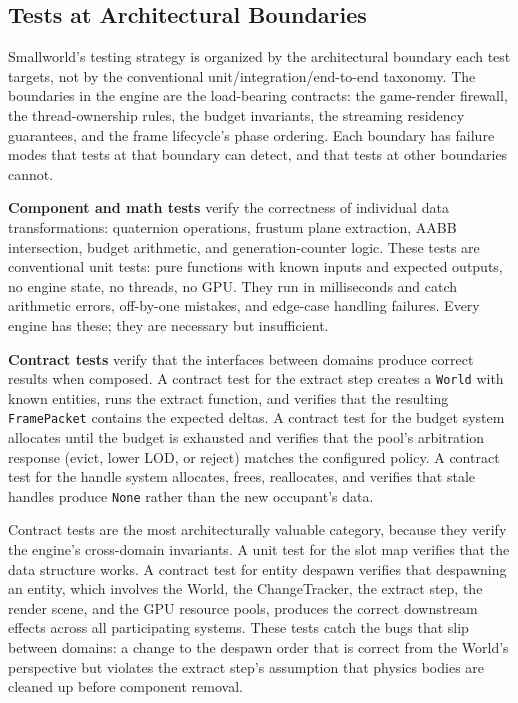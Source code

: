 \documentclass[
  11pt,
  letterpaper,
  DIV=11,
  numbers=noendperiod,
  twoside,
  open=right]{scrreprt}
\begin{document}
\subsection{Tests at Architectural Boundaries}\label{sec-tests}

Smallworld's testing strategy is organized by the architectural boundary
each test targets, not by the conventional unit/integration/end-to-end
taxonomy. The boundaries in the engine are the load-bearing contracts:
the game-render firewall, the thread-ownership rules, the budget
invariants, the streaming residency guarantees, and the frame
lifecycle's phase ordering. Each boundary has failure modes that tests
at that boundary can detect, and that tests at other boundaries cannot.

\textbf{Component and math tests} verify the correctness of individual
data transformations: quaternion operations, frustum plane extraction,
AABB intersection, budget arithmetic, and generation-counter logic.
These tests are conventional unit tests: pure functions with known
inputs and expected outputs, no engine state, no threads, no GPU. They
run in milliseconds and catch arithmetic errors, off-by-one mistakes,
and edge-case handling failures. Every engine has these; they are
necessary but insufficient.

\textbf{Contract tests} verify that the interfaces between domains
produce correct results when composed. A contract test for the extract
step creates a \texttt{World} with known entities, runs the extract
function, and verifies that the resulting \texttt{FramePacket} contains
the expected deltas. A contract test for the budget system allocates
until the budget is exhausted and verifies that the pool's arbitration
response (evict, lower LOD, or reject) matches the configured policy. A
contract test for the handle system allocates, frees, reallocates, and
verifies that stale handles produce \texttt{None} rather than the new
occupant's data.

Contract tests are the most architecturally valuable category, because
they verify the engine's cross-domain invariants. A unit test for the
slot map verifies that the data structure works. A contract test for
entity despawn verifies that despawning an entity, which involves the
World, the ChangeTracker, the extract step, the render scene, and the
GPU resource pools, produces the correct downstream effects across all
participating systems. These tests catch the bugs that slip between
domains: a change to the despawn order that is correct from the World's
perspective but violates the extract step's assumption that physics
bodies are cleaned up before component removal.
\end{document}
